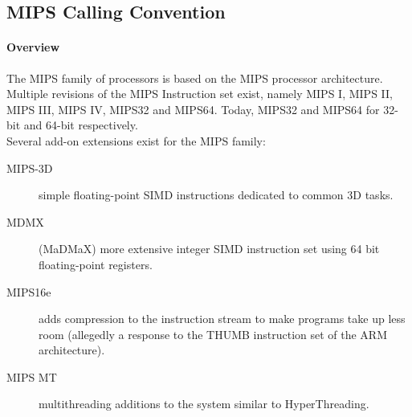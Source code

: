 %
%
%
%

\subsection{MIPS Calling Convention}

\paragraph{Overview}

The MIPS family of processors is based on the MIPS processor architecture.
Multiple revisions of the MIPS Instruction set exist, namely MIPS I, MIPS II, MIPS III, MIPS IV, MIPS32 and MIPS64.
Today, MIPS32 and MIPS64 for 32-bit and 64-bit respectively.\\
Several add-on extensions exist for the MIPS family: 

\begin{description}
\item [MIPS-3D] simple floating-point SIMD instructions dedicated to common 3D tasks.
\item [MDMX] (MaDMaX) more extensive integer SIMD instruction set using 64 bit floating-point registers.
\item [MIPS16e] adds compression to the instruction stream to make programs take up less room (allegedly a response to the THUMB instruction set of the ARM architecture).
\item [MIPS MT] multithreading additions to the system similar to HyperThreading.
\end{description}


